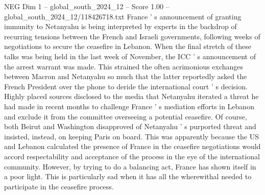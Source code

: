 \begin{textsample}{NEG Dim 1 – global\_south\_2024\_12 – Score 1.00 – global\_south\_2024\_12/118426718.txt}
France ' s announcement of granting immunity to Netanyahu is being interpreted by experts in the backdrop of recurring tensions between the French and Israeli governments, following weeks of negotiations to secure the ceasefire in Lebanon.
When the final stretch of these talks was being held in the last week of November, the ICC ' s announcement of the arrest warrant was made.
This strained the often acrimonious exchanges between Macron and Netanyahu so much that the latter reportedly asked the French President over the phone to deride the international court ' s decision.
Highly placed sources disclosed to the media that Netanyahu iterated a threat he had made in recent months to challenge France ' s mediation efforts in Lebanon and exclude it from the committee overseeing a potential ceasefire.
Of course, both Beirut and Washington disapproved of Netanyahu ' s purported threat and insisted, instead, on keeping Paris on board.
This was apparently because the US and Lebanon calculated the presence of France in the ceasefire negotiations would accord respectability and acceptance of the process in the eye of the international community.
However, by trying to do a balancing act, France has shown itself in a poor light.
This is particularly sad when it has all the wherewithal needed to participate in the ceasefire process.

\end{textsample}
